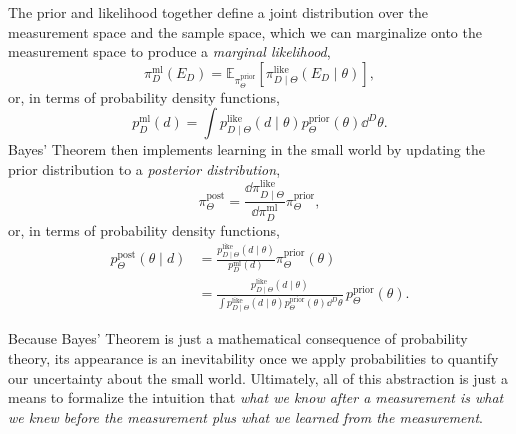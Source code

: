 The prior and likelihood together define a joint distribution over the 
measurement space and the sample space, which we can marginalize 
onto the measurement space to produce a \emph{marginal likelihood},
%
\begin{equation*}
\pi_{D}^{\mathrm{ml}} \! \left( E_{D} \right)
=
\mathbb{E}_{\pi_{\Theta}^{\mathrm{prior}}} \! \left[  
\pi_{D \mid \Theta}^{\mathrm{like}} \! \left( E_{D} \mid \theta \right)
\right],
\end{equation*}
%
or, in terms of probability density functions, 
%
\begin{equation*}
p_{D}^{\mathrm{ml}} \! \left( d \right)  = 
\int p_{D \mid \Theta}^{\mathrm{like}} \! \left( d \mid \theta \right)
p_{\Theta}^{\mathrm{prior}} \! \left( \theta \right) \dd^{D} \theta.
\end{equation*}
%
Bayes' Theorem then implements learning in the small world
by updating the prior distribution to a \emph{posterior distribution},
%
\begin{equation*}
\pi_{\Theta}^{\mathrm{post}}
=
\frac{ \dd \pi_{D \mid \Theta}^{\mathrm{like}} }
{ \dd \pi_{D}^{\mathrm{ml}} }
\pi_{\Theta}^{\mathrm{prior}},
\end{equation*}
%
or, in terms of probability density functions,
%
\begin{align*}
p_{\Theta}^{\mathrm{post}} \! \left( \theta \mid d \right)
&=
\frac
{ p_{D \mid \Theta}^{\mathrm{like}} \! \left( d \mid \theta \right) }
{ p_{D}^{\mathrm{ml}} \! \left( d \right) }
\pi_{\Theta}^{\mathrm{prior}} \! \left( \theta \right)
\\
&=
\frac
{ p_{D \mid \Theta}^{\mathrm{like}} \! \left( d \mid \theta \right) }
{ \int p_{D \mid \Theta}^{\mathrm{like}} \! \left( d \mid \theta \right)
p_{\Theta}^{\mathrm{prior}} \! \left( \theta \right) \dd^{D} \theta }
\, p_{\Theta}^{\mathrm{prior}} \! \left( \theta \right).
\end{align*}

Because Bayes' Theorem is just a mathematical consequence of 
probability theory, its appearance is an inevitability once we apply 
probabilities to quantify our uncertainty about the small world.  
Ultimately, all of this abstraction is just a means to formalize the 
intuition that \emph{what we know after a measurement is what 
we knew before the measurement plus what we learned from the 
measurement}.

